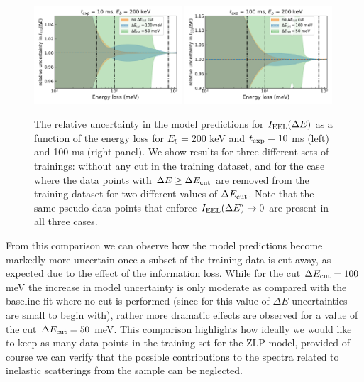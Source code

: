 \begin{figure}[t]
    \centering
    \includegraphics[width=0.49\textwidth]{plots/prediction_with_cut_10ms.pdf}
    \includegraphics[width=0.49\textwidth]{plots/prediction_with_cut_100ms.pdf}
    \caption{\small The relative uncertainty in the model predictions for $I_{\rm EEL}(\Delta E)$
      as a function of the energy loss for $E_b=200$ keV and $t_{\rm exp}=10$ ms (left)
      and 100 ms (right panel).
      We show results for three different sets of trainings: without any cut
      in the training dataset, and for the case where the data points with $\Delta E \ge \Delta E_{\rm cut}$
      are removed from the training dataset for two different values
      of $\Delta E_{\rm cut}$.
      Note that the same pseudo-data points that enforce $I_{\rm EEL}(\Delta E)\to 0$ are present
      in all three cases.
      \label{fig:EELS_vacuum_cuts}}
\end{figure}

From this comparison we can observe how the model predictions become markedly more uncertain
once a subset of the training data is cut away, as expected due to the effect of the information
loss.
%
While for the cut $\Delta E_{\rm cut}=100$ meV the increase in model uncertainty is only moderate
as compared with the baseline fit where no cut is performed (since for this value of $\Delta E$
uncertainties are small to begin with), rather more dramatic effects are observed
for a value of the cut $\Delta E_{\rm cut}=50$ meV.
%
This comparison highlights how ideally we would like to keep as many data points
in the training set for the ZLP model, provided of course we can verify that the
possible contributions to the spectra related to inelastic scatterings from the
sample can be neglected.

